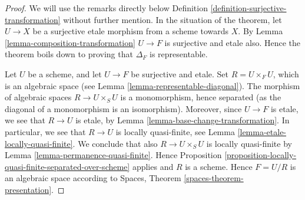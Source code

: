 \begin{proof}
We will use the remarks directly below
Definition \ref{definition-surjective-transformation}
without further mention.
In the situation of the theorem, let $U \to X$ be a surjective etale morphism
from a scheme towards $X$.
By Lemma \ref{lemma-composition-transformation}
$U \to F$ is surjective and etale also.
Hence the theorem boils down to proving that
$\Delta_F$ is representable.

\medskip\noindent
Let $U$ be a scheme, and let $U \to F$ be surjective and etale.
Set $R = U \times_F U$, which is an algebraic space (see
Lemma \ref{lemma-representable-diagonal}).
The morphism of algebraic spaces $R \to U \times_S U$ is a monomorphism,
hence separated (as the diagonal of a monomorphism is an isomorphism).
Moreover, since $U \to F$ is etale, we see that $R \to U$ is etale, by
Lemma \ref{lemma-base-change-transformation}. In particular, we see
that $R \to U$ is locally quasi-finite, see
Lemma \ref{lemma-etale-locally-quasi-finite}.
We conclude that also $R \to U \times_S U$ is
locally quasi-finite by
Lemma \ref{lemma-permanence-quasi-finite}.
Hence
Proposition \ref{proposition-locally-quasi-finite-separated-over-scheme}
applies and $R$ is a scheme. Hence $F = U/R$ is an algebraic
space according to
Spaces, Theorem \ref{spaces-theorem-presentation}.
\end{proof}



































